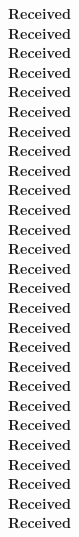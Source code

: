 \documentclass[12pt,letterpaper,twocolumn]{article}
\begin{document}
    \LARGE\bf\noindent
    \monthname[\the\month]\hfill\the\year\hfill Received\\
    \monthname[\the\month]\hfill\the\year\hfill Received\\
    \monthname[\the\month]\hfill\the\year\hfill Received\\
    \monthname[\the\month]\hfill\the\year\hfill Received\\
    \monthname[\the\month]\hfill\the\year\hfill Received\\
    \monthname[\the\month]\hfill\the\year\hfill Received\\
    \monthname[\the\month]\hfill\the\year\hfill Received\\
    \monthname[\the\month]\hfill\the\year\hfill Received\\
    \monthname[\the\month]\hfill\the\year\hfill Received\\
    \monthname[\the\month]\hfill\the\year\hfill Received\\
    \monthname[\the\month]\hfill\the\year\hfill Received\\
    \monthname[\the\month]\hfill\the\year\hfill Received\\
    \monthname[\the\month]\hfill\the\year\hfill Received\\
    \monthname[\the\month]\hfill\the\year\hfill Received\\
    \monthname[\the\month]\hfill\the\year\hfill Received\\
    \monthname[\the\month]\hfill\the\year\hfill Received\\
    \monthname[\the\month]\hfill\the\year\hfill Received\\
    \monthname[\the\month]\hfill\the\year\hfill Received\\
    \monthname[\the\month]\hfill\the\year\hfill Received\\
    \monthname[\the\month]\hfill\the\year\hfill Received\\
    \monthname[\the\month]\hfill\the\year\hfill Received\\
    \monthname[\the\month]\hfill\the\year\hfill Received\\
    \monthname[\the\month]\hfill\the\year\hfill Received\\
    \monthname[\the\month]\hfill\the\year\hfill Received\\
    \monthname[\the\month]\hfill\the\year\hfill Received\\
    \monthname[\the\month]\hfill\the\year\hfill Received\\
    \monthname[\the\month]\hfill\the\year\hfill Received\\
\end{document}
